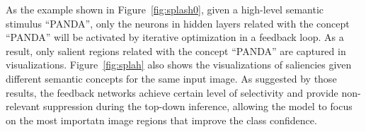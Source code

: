 As the example shown in Figure~\ref{fig:splash0}, given a high-level semantic stimulus ``PANDA'', only the neurons in hidden layers related with the concept ``PANDA'' will be activated by iterative optimization in a feedback loop. As a result, only salient regions related with the concept ``PANDA'' are captured in visualizations. Figure~\ref{fig:splah} also shows the visualizations of saliencies given different semantic concepts for the same input image. As suggested by those results, the feedback networks achieve certain level of selectivity and provide non-relevant suppression during the top-down inference, allowing the model to focus on the most importatn image regions that improve the class confidence. 


